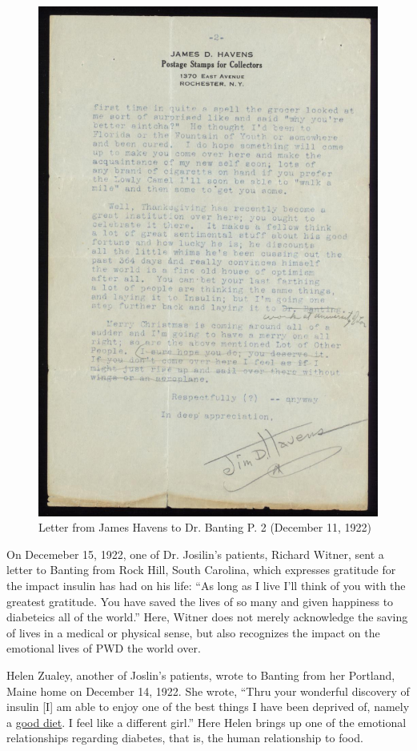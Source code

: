 \documentclass[12pt]{article}
\begin{document}
\begin{figure}
\centering
  \includegraphics [width=5in]{thankshavep2}
  \caption{Letter from James Havens to Dr. Banting P. 2 (December 11, 1922)}
  \label{fig: Thanksgiving Letter P. 2}
\end{figure}

On Decemeber 15, 1922, one of Dr. Josilin's patients, Richard Witner, sent a letter to Banting from Rock Hill, South Carolina, which expresses gratitude for the impact insulin has had on his life:
``As long as I live I'll think of you with the greatest gratitude. You have saved the lives of so many and given happiness to diabeteics all of the world.''
Here, Witner does not merely acknowledge the saving of lives in a medical or physical sense, but also recognizes the impact on the emotional lives of PWD the world over. 

Helen Zualey, another of Joslin's patients, wrote to Banting from her Portland, Maine home on December 14, 1922. She wrote, ``Thru your wonderful discovery of insulin [I] am able to enjoy one of the best things I have been deprived of, namely a \underline{good diet}. I feel like a different girl.'' 
Here Helen brings up one of the emotional relationships regarding diabetes, that is, the human relationship to food. 
\end{document}
